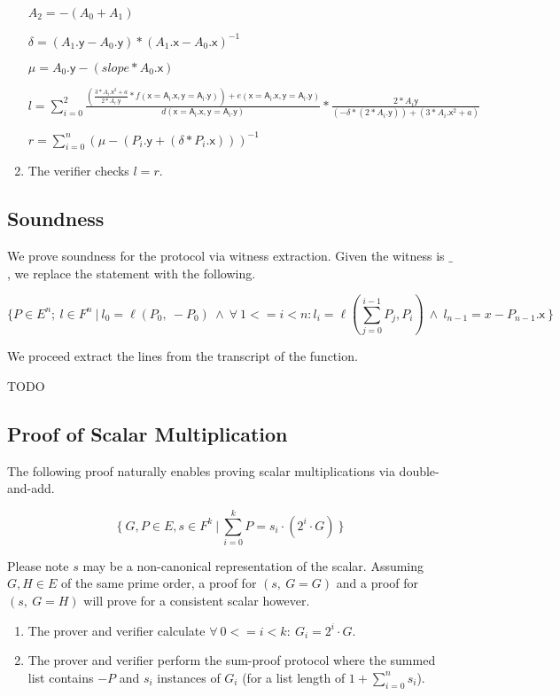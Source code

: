 \documentclass[]{article}
\begin{document}
\begin{enumerate}
		$A_2 = -(A_0 + A_1)$
		
		$\delta = (A_1\mathsf{.y} - A_0\mathsf{.y}) * (A_1\mathsf{.x} - A_0\mathsf{.x})^{-1}$
		
		$\mu = A_0\mathsf{.y} - (slope * A_0\mathsf{.x})$
		
		$l = \sum^2_{i=0}
		\frac{
		  (
		    \frac{
  			  3 * A_i\mathsf{.x}^2 + a
  	        }{
	          2 * A_i\mathsf{.y}
            } *
		    f(\mathsf{x = A_i.x, y = A_i.y})
		  ) + e(\mathsf{x = A_i.x, y = A_i.y})
	    }{
	      d(\mathsf{x = A_i.x, y = A_i.y})
        }
    	*
		\frac{
		  2 * A_i\mathsf{y}
	    }{
	      (-\delta * (2 * A_i\mathsf{.y})) + (3 * A_i\mathsf{.x}^2 + a)
        }$
		
		$r = \sum^n_{i=0} (\mu - (P_i\mathsf{.y} + (\delta * P_i\mathsf{.x})))^{-1}$
		
		\item The verifier checks $l = r$.
	\end{enumerate}
	
	\subsection{Soundness}
	
	We prove soundness for the protocol via witness extraction. Given the witness is $\_$, we replace the statement with the following.
	
	$$\{
	  P \in E^n;~
	  l \in F^n ~|~
	  l_0 = \ell(P_0,~ -P_0) ~\wedge~
	  \forall~ 1 <= i < n: l_i = \ell(\sum^{i-1}_{j=0} P_j, P_i) ~\wedge~
	  l_{n-1} = x - P_{n-1}\mathsf{.x} ~
	\}$$
	
	We proceed extract the lines from the transcript of the function. 
	
	TODO
	
	\subsection{Proof of Scalar Multiplication}

	The following proof naturally enables proving scalar multiplications via double-and-add.

	$$
	\{~ G, P \in E, s \in F^k ~|~ \sum^k_{i=0} P = s_i \cdot (2^i \cdot G) ~\}
	$$
	
	Please note $s$ may be a non-canonical representation of the scalar. Assuming $G, H \in E$ of the same prime order, a proof for $(s,~ G=G)$ and a proof for $(s,~ G=H)$ will prove for a consistent scalar however.
	
	\begin{enumerate}
		\item The prover and verifier calculate $\forall~ 0 <= i < k:~ G_i = 2^i \cdot G$.
		\item The prover and verifier perform the sum-proof protocol where the summed list contains $-P$ and $s_i$ instances of $G_i$ (for a list length of $1 + \sum^n_{i=0} s_i$).
	\end{enumerate}
\end{document}
